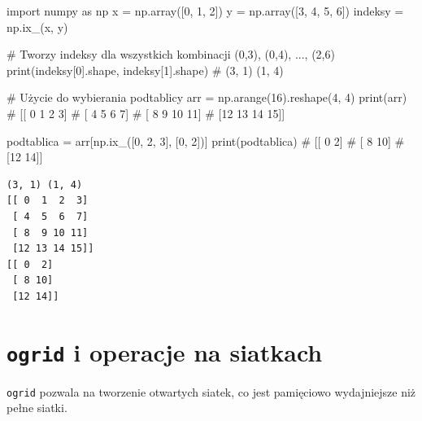 \documentclass[
  letterpaper,
  DIV=11,
  numbers=noendperiod]{scrreprt}
\newenvironment{Shaded}{\begin{snugshade}}{\end{snugshade}}
\newcommand{\BuiltInTok}[1]{\textcolor[rgb]{0.00,0.23,0.31}{#1}}
\newcommand{\CommentTok}[1]{\textcolor[rgb]{0.37,0.37,0.37}{#1}}
\newcommand{\DecValTok}[1]{\textcolor[rgb]{0.68,0.00,0.00}{#1}}
\newcommand{\ImportTok}[1]{\textcolor[rgb]{0.00,0.46,0.62}{#1}}
\newcommand{\NormalTok}[1]{\textcolor[rgb]{0.00,0.23,0.31}{#1}}
\newcommand{\OperatorTok}[1]{\textcolor[rgb]{0.37,0.37,0.37}{#1}}
\begin{document}
\begin{Shaded}
\begin{Highlighting}[]
\ImportTok{import}\NormalTok{ numpy }\ImportTok{as}\NormalTok{ np}
\NormalTok{x }\OperatorTok{=}\NormalTok{ np.array([}\DecValTok{0}\NormalTok{, }\DecValTok{1}\NormalTok{, }\DecValTok{2}\NormalTok{])}
\NormalTok{y }\OperatorTok{=}\NormalTok{ np.array([}\DecValTok{3}\NormalTok{, }\DecValTok{4}\NormalTok{, }\DecValTok{5}\NormalTok{, }\DecValTok{6}\NormalTok{])}
\NormalTok{indeksy }\OperatorTok{=}\NormalTok{ np.ix\_(x, y)}

\CommentTok{\# Tworzy indeksy dla wszystkich kombinacji (0,3), (0,4), ..., (2,6)}
\BuiltInTok{print}\NormalTok{(indeksy[}\DecValTok{0}\NormalTok{].shape, indeksy[}\DecValTok{1}\NormalTok{].shape)  }\CommentTok{\# (3, 1) (1, 4)}

\CommentTok{\# Użycie do wybierania podtablicy}
\NormalTok{arr }\OperatorTok{=}\NormalTok{ np.arange(}\DecValTok{16}\NormalTok{).reshape(}\DecValTok{4}\NormalTok{, }\DecValTok{4}\NormalTok{)}
\BuiltInTok{print}\NormalTok{(arr)}
\CommentTok{\# [[ 0  1  2  3]}
\CommentTok{\#  [ 4  5  6  7]}
\CommentTok{\#  [ 8  9 10 11]}
\CommentTok{\#  [12 13 14 15]]}

\NormalTok{podtablica }\OperatorTok{=}\NormalTok{ arr[np.ix\_([}\DecValTok{0}\NormalTok{, }\DecValTok{2}\NormalTok{, }\DecValTok{3}\NormalTok{], [}\DecValTok{0}\NormalTok{, }\DecValTok{2}\NormalTok{])]}
\BuiltInTok{print}\NormalTok{(podtablica)}
\CommentTok{\# [[ 0  2]}
\CommentTok{\#  [ 8 10]}
\CommentTok{\#  [12 14]]}
\end{Highlighting}
\end{Shaded}

\begin{verbatim}
(3, 1) (1, 4)
[[ 0  1  2  3]
 [ 4  5  6  7]
 [ 8  9 10 11]
 [12 13 14 15]]
[[ 0  2]
 [ 8 10]
 [12 14]]
\end{verbatim}

\section{\texorpdfstring{\texttt{ogrid} i operacje na
siatkach}{ogrid i operacje na siatkach}}\label{ogrid-i-operacje-na-siatkach}

\texttt{ogrid} pozwala na tworzenie otwartych siatek, co jest pamięciowo
wydajniejsze niż pełne siatki.
\end{document}
